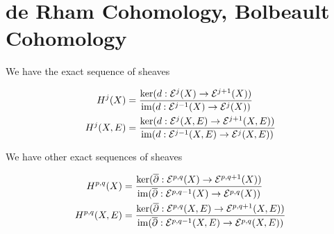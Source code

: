 \section{de Rham Cohomology, Bolbeault Cohomology}

We have the exact sequence of sheaves

\begin{center}
\end{center}

\begin{definition}
	\begin{align*}
		H^j(X) &= \frac{\ker (d: \mathcal{E}^j(X) \to \mathcal{E}^{j+1}(X))}{\operatorname{im} (d: \mathcal{E}^{j-1}(X) \to \mathcal{E}^j(X))} \\
		H^j(X, E) &= \frac{\ker (d: \mathcal{E}^j(X, E) \to \mathcal{E}^{j+1}(X, E))}{\operatorname{im} (d: \mathcal{E}^{j-1}(X, E) \to \mathcal{E}^j(X, E))}
	\end{align*}
\end{definition}

We have other exact sequences of sheaves

\begin{center}
\end{center}

\begin{definition}
	\begin{align*}
		H^{p, q}(X) &= \frac{\ker(\overline{\partial}: \mathcal{E}^{p, q}(X) \to \mathcal{E}^{p, q+1}(X))}{\operatorname{im} (\overline{\partial}: \mathcal{E}^{p, q-1}(X) \to \mathcal{E}^{p, q}(X))} \\
		H^{p, q}(X, E) &= \frac{\ker(\overline{\partial}: \mathcal{E}^{p, q}(X, E) \to \mathcal{E}^{p, q+1}(X, E))}{\operatorname{im} (\overline{\partial}: \mathcal{E}^{p, q-1}(X, E) \to \mathcal{E}^{p, q}(X, E))}
	\end{align*}
\end{definition}



